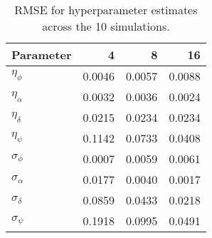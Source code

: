 \begin{table}[ht]
\centering
\caption{RMSE for hyperparameter estimates across the 10 simulations.} 
\label{t:hyperparameter}
\begin{tabular}{lrrr}
  \hline
Parameter & 4 & 8 & 16 \\ 
  \hline
$\eta_\phi$ & 0.0046 & 0.0057 & 0.0088 \\ 
  $\eta_\alpha$ & 0.0032 & 0.0036 & 0.0024 \\ 
  $\eta_\delta$ & 0.0215 & 0.0234 & 0.0234 \\ 
  $\eta_\psi$ & 0.1142 & 0.0733 & 0.0408 \\ 
   \hline
$\sigma_\phi$ & 0.0007 & 0.0059 & 0.0061 \\ 
  $\sigma_\alpha$ & 0.0177 & 0.0040 & 0.0017 \\ 
  $\sigma_\delta$ & 0.0859 & 0.0433 & 0.0218 \\ 
  $\sigma_\psi$ & 0.1918 & 0.0995 & 0.0491 \\ 
   \hline
\end{tabular}
\end{table}
